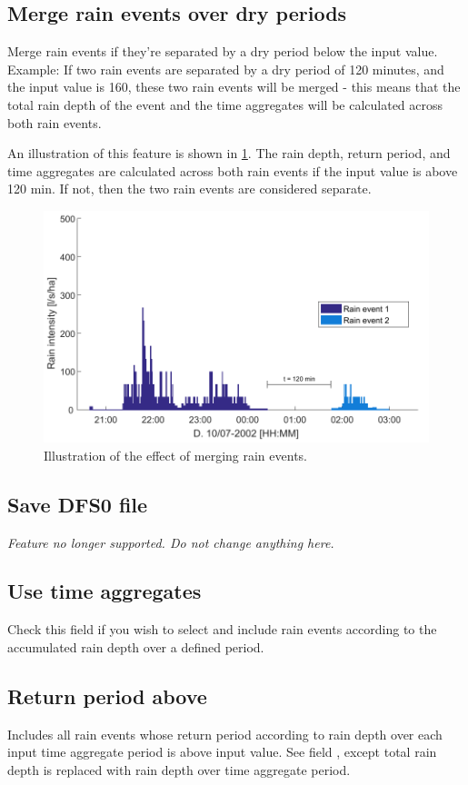\documentclass[a4paper,11pt]{refart}
\begin{document}
	\subsection{Merge rain events over dry periods}
	\label{field10}
	Merge rain events if they're separated by a dry period below the input value. Example: If two rain events are separated by a dry period of 120 minutes, and the input value is 160, these two rain events will be merged - this means that the total rain depth of the event and the time aggregates will be calculated across both rain events. 
	
	An illustration of this feature is shown in \ref{fig:RainEventPatterns2}. The rain depth, return period, and time aggregates are calculated across both rain events if the input value is above 120 min. If not, then the two rain events are considered separate. 
	
	\begin{figure}[H]\centering
		\includegraphics[scale=0.7]{RainEventPatterns2.pdf}
		\caption{Illustration of the effect of merging rain events.}\label{fig:RainEventPatterns2}
	\end{figure}
	
	\subsection*{Save DFS0 file}
	\textit{Feature no longer supported. Do not change anything here. }
	\subsection{Use time aggregates}
	Check this field if you wish to select and include rain events according to the accumulated rain depth over a defined period. 
	\subsection{Return period above}
	\label{fiield11}
	Includes all rain events whose return period according to rain depth over each input time aggregate period is above input value. 
	See field , except total rain depth is replaced with rain depth over time aggregate period.
\end{document}
